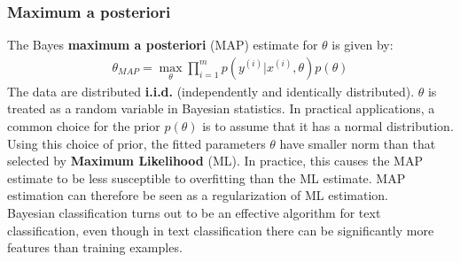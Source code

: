 \documentclass{report}
\begin{document}
\subsubsection{Maximum a posteriori}
The Bayes {\bf maximum a posteriori} (MAP) estimate for $\theta$ is given by:
\begin{align*}
\theta_{MAP}=\max\limits_{\theta} \prod_{i=1}^m p(y^{(i)}\vert x^{(i)},\theta)p(\theta)
\end{align*}
The data are distributed {\bf i.i.d.} (independently and identically distributed). $\theta$ is treated as a random variable in Bayesian statistics.
In practical applications, a common choice for the prior $p(\theta)$ is to assume that it has a normal distribution.
Using this choice of prior, the fitted parameters $\theta$ have smaller norm than that selected by {\bf Maximum Likelihood} (ML).
In practice, this causes the MAP estimate to be less susceptible to overfitting than the ML estimate. MAP estimation can therefore be seen as a regularization of ML estimation.
\\
Bayesian classification turns out to be an effective algorithm for text classification, even though in text classification there can be significantly more features than training examples.
\end{document}
